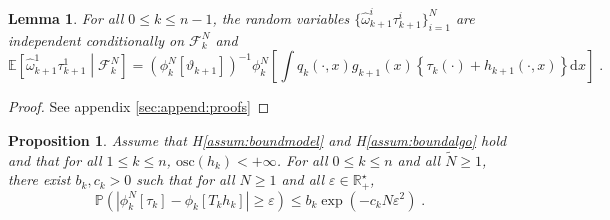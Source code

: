 \documentclass[12pt,draft]{article}
\newcommand{\rmd}{\mathrm{d}}
\newcommand{\eqsp}{\;}
\newcommand{\1}{\mathrm{1}}
\newtheorem{lemma}{Lemma}
\newtheorem{proposition}{Proposition}
\begin{document}
\begin{lemma}
\label{lem:iid}
For all $0\le k \le n-1$, the random variables $\{\widehat{\omega}_{k+1}^i\tau_{k+1}^i\}_{i=1}^N$ are independent conditionally on $\mathcal{F}_k^{N}$ and%
\[
\mathbb{E}\left[\widehat{\omega}^1_{k+1}\tau^{1}_{k+1}\middle| \mathcal{F}_k^{N}\right] = \left(\phi^N_{k}[\vartheta_{k+1}]\right)^{-1}\phi^N_{k}\left[\int q_{k}(\cdot,x)g_{k+1}(x)\left\{\tau_k(\cdot) + h_{k+1}(\cdot,x)\right\}\rmd x\right]\eqsp.
\]
\end{lemma}

\begin{proof}
See appendix \ref{sec:append:proofs}
\end{proof}

\begin{proposition}
Assume that H\ref{assum:boundmodel} and H\ref{assum:boundalgo} hold and that for all $1\le k\le n$, $\mathrm{osc}(h_k)<+\infty$. For all $0\le k\le n$ and all $\widetilde{N}\ge 1$, there exist $b_k,c_k>0$ such that for all $N\ge 1$ and all $\varepsilon\in\mathbb{R}_+^\star$,
\[
\mathbb{P}\left(\left|\phi_k^N[\tau_k] - \phi_k\left[T_kh_k\right]\right|\ge \varepsilon\right)\le b_k\exp\left(-c_kN\varepsilon^2\right)\eqsp.
\]
\end{proposition}
\end{document}
